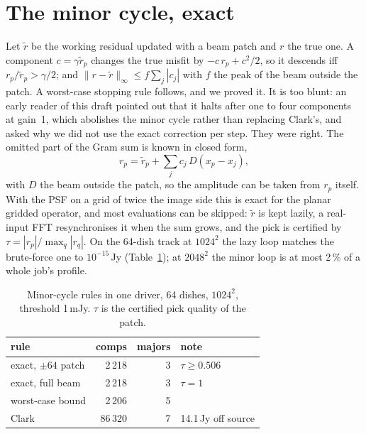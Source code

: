 \documentclass[twocolumn,10pt]{article}
\theoremstyle{remark}
\newcommand{\norm}[1]{\lVert #1\rVert}
\begin{document}
\section{The minor cycle, exact}

Let $\tilde r$ be the working residual updated with a beam patch and $r$ the true one. A component $c=\gamma\tilde r_p$ changes the true misfit by $-c\,r_p+c^2/2$, so it descends iff $r_p/\tilde r_p>\gamma/2$; and $\norm{r-\tilde r}_\infty\le f\sum_j|c_j|$ with $f$ the peak of the beam outside the patch. A worst-case stopping rule follows, and we proved it. It is too blunt: an early reader of this draft pointed out that it halts after one to four components at gain~1, which abolishes the minor cycle rather than replacing Clark's, and asked why we did not use the exact correction per step. They were right. The omitted part of the Gram sum is known in closed form,
\begin{equation}\label{eq:exact}
r_p=\tilde r_p+\sum_{j}c_j\,D(x_p-x_j),
\end{equation}
with $D$ the beam outside the patch, so the amplitude can be taken from $r_p$ itself. With the PSF on a grid of twice the image side this is exact for the planar gridded operator, and most evaluations can be skipped: $\tilde r$ is kept lazily, a real-input FFT resynchronises it when the sum grows, and the pick is certified by $\tau=|r_p|/\max_q|r_q|$. On the 64-dish track at $1024^2$ the lazy loop matches the brute-force one to $10^{-15}$\,Jy (Table~\ref{tab:minor}); at $2048^2$ the minor loop is at most 2\,\% of a whole job's profile.

\begin{table}
\centering
\caption{Minor-cycle rules in one driver, 64 dishes, $1024^2$, threshold 1\,mJy. $\tau$ is the certified pick quality of the patch.}
\label{tab:minor}
\footnotesize
\begin{tabular}{@{}lrrl@{}}
\toprule
rule & comps & majors & note\\
\midrule
exact, $\pm64$ patch & 2\,218 & 3 & $\tau\ge0.506$\\
exact, full beam & 2\,218 & 3 & $\tau=1$\\
worst-case bound & 2\,206 & 5 & \\
Clark & 86\,320 & 7 & 14.1\,Jy off source\\
\bottomrule
\end{tabular}
\end{table}
\end{document}
